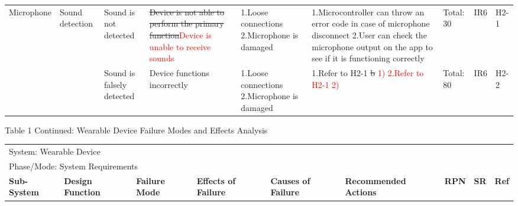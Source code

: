 \documentclass[12pt, titlepage]{article}
\begin{document}
\begin{landscape}
\begin{table}[H]
\begin{tabular}{| p{} | p{}  | p{} | p{} | p{} | p{} | p{} | p{} | p{} |}
        Microphone & Sound detection & Sound is not detected & \sout{Device is not able to perform the primary function}\textcolor{red}{Device is unable to receive sounds}  & 1.Loose connections \newline 2.Microphone is damaged  & 1.Microcontroller can throw an error code in case of microphone disconnect \newline 2.User can check the microphone output on the app to see if it is functioning correctly & Total: 30  & IR6  & H2-1 \\ \cline{3-9}
    
         & & Sound is falsely detected & Device functions incorrectly & 1.Loose connections \newline 2.Microphone is damaged & 1.Refer to H2-1 \sout{b} \textcolor{red}{1)} \newline \textcolor{red}{2.Refer to H2-1 2)} & Total: 80 & IR6 & H2-2 \\ \hline
     
        \end{tabular}

\end{table}
\begin{table}[H]
    \centering
        Table 1 Continued: Wearable Device Failure Modes and Effects Analysis
        \begin{tabular}{| p{} | p{}  | p{} | p{} | p{} | p{} | p{} | p{} | p{} |}
            \hline
        
        \multicolumn{9}{|l|}{System: Wearable Device} \\
        \multicolumn{9}{|l|}{Phase/Mode: System Requirements} \\ \hline
        \textbf{Sub-System} & \textbf{Design Function} & \textbf{Failure Mode} & \textbf{Effects of Failure} & \textbf{Causes of Failure} & \textbf{Recommended Actions} & \textbf{RPN} & \textbf{SR} & \textbf{Ref} \\ \hline
    

\end{tabular}
\end{table}
\end{landscape}
\end{document}
